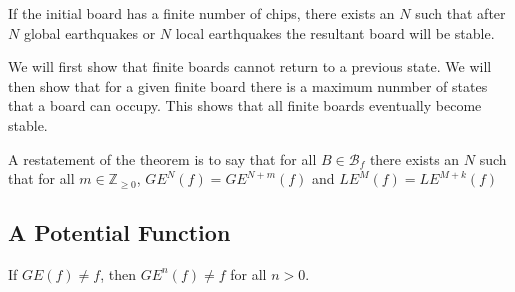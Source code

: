 \documentclass[runningheads,a4paper]{llncs}
\begin{document}
\begin{theorem}
\label{finitestability}
If the initial board has a finite number of chips, there exists an $N$ such that after $N$ global earthquakes or $N$ local earthquakes the resultant board will be stable.
\end{theorem}

We will first show that finite boards cannot return to a previous state. We will then show that for a given finite board there is a maximum nunmber of states that a board can occupy. This shows that all finite boards eventually become stable.

A restatement of the theorem is to say that for all $B \in \mathcal{B}_f$ there exists an $N$ such that for all $m \in \mathbb{Z}_{\geq 0}$, $GE^N(f) = GE^{N+m}(f)$ and $LE^{M}(f) = LE^{M+k}(f)$

\subsection{A Potential Function}
\begin{lemma}
If $GE(f) \neq f$, then $GE^n(f) \neq f$ for all $n > 0$.
\end{lemma}
\end{document}

